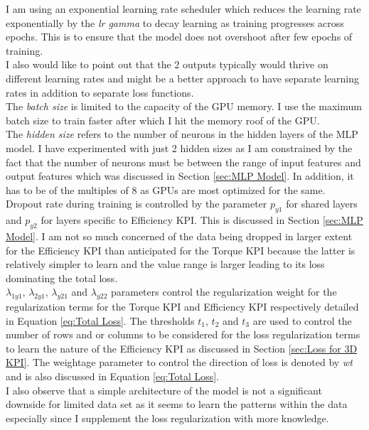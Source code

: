 \documentclass{report} %
\begin{document}
I am using an exponential learning rate scheduler which reduces the learning rate exponentially by the \textit{lr gamma} to decay learning as training progresses across epochs.
This is to ensure that the model does not overshoot after few epochs of training.\\
I also would like to point out that the 2 outputs typically would thrive on different learning rates and might be a better approach to have separate learning rates in addition 
to separate loss functions.\\
The \textit{batch size} is limited to the capacity of the \ac{GPU} memory. I use the maximum batch size to train faster after which I hit the memory roof of the \ac{GPU}.\\
The \textit{hidden size} refers to the number of neurons in the hidden layers of the \ac{MLP} model. I have experimented with just 2 hidden sizes as I am 
constrained by the fact that the number of neurons must be between the range of input features and output features which was discussed in Section \ref{sec:MLP Model}.
In addition, it has to be of the multiples of 8 as \ac{GPU}s are most optimized for the same.\\
Dropout rate during training is controlled by the parameter \textit{$p_{y1}$} for shared layers and \textit{$p_{y2}$} for layers specific to Efficiency \ac{KPI}. 
This is discussed in Section \ref{sec:MLP Model}. I am not so much concerned of the data being dropped in larger extent for the Efficiency \ac{KPI} than anticipated 
for the Torque \ac{KPI} because the latter is relatively simpler to learn and the value range is larger leading to its loss dominating the total loss.\\
\textit{$\lambda_{1y1}$}, \textit{$\lambda_{2y1}$}, \textit{$\lambda_{y21}$} and \textit{$\lambda_{y22}$} parameters control the regularization weight for the 
regularization terms for the Torque \ac{KPI} and Efficiency \ac{KPI} respectively detailed in Equation \ref{eq:Total Loss}.
The thresholds \textit{$t_{1}$}, \textit{$t_{2}$} and \textit{$t_{3}$} are used to control the number of rows and or columns to be considered for the loss
regularization terms to learn the nature of the Efficiency \ac{KPI} as discussed in Section \ref{sec:Loss for 3D KPI}.
The weightage parameter to control the direction of loss is denoted by \textit{wt} and is also discussed in Equation \ref{eq:Total Loss}.\\
I also observe that a simple architecture of the model is not a significant downside for limited data set as it seems to learn the patterns within the data 
especially since I supplement the loss regularization with more knowledge.
\end{document}
